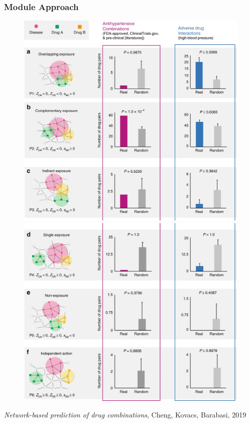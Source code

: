 \documentclass{beamer}
\begin{document}
\begin{frame}
  \frametitle{Module Approach}
  \begin{figure}[!htb]
      \includegraphics[width=\linewidth]{figs/barabasi-hypertension_a-c.png}
    \endminipage\hfill 
      \includegraphics[width=\linewidth]{figs/barabasi-hypertension_d-f.png}
    \endminipage
  \end{figure}
  \small{\textit{Network-based prediction of drug combinations}, Cheng, Kovacs, Barabasi, 2019}~\cite{Cheng2019} 
\end{frame}
\end{document}

